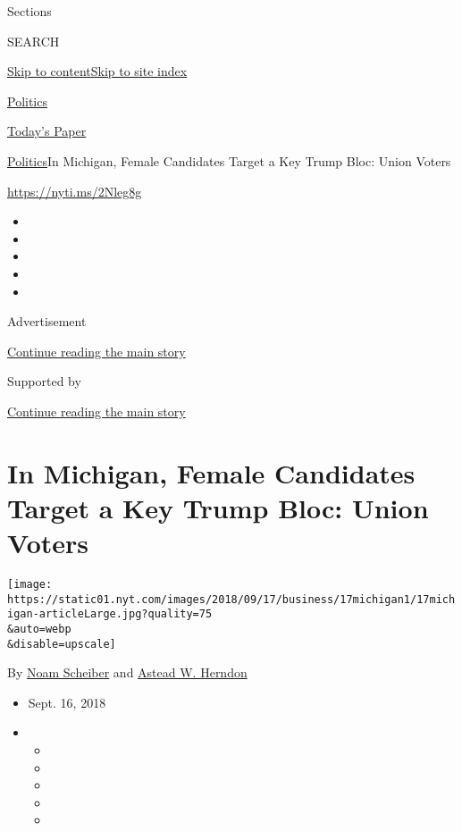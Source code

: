 Sections

SEARCH

\protect\hyperlink{site-content}{Skip to
content}\protect\hyperlink{site-index}{Skip to site index}

\href{https://www.nytimes.com/section/politics}{Politics}

\href{https://myaccount.nytimes.com/auth/login?response_type=cookie\&client_id=vi}{}

\href{https://www.nytimes.com/section/todayspaper}{Today's Paper}

\href{/section/politics}{Politics}\textbar{}In Michigan, Female
Candidates Target a Key Trump Bloc: Union Voters

\url{https://nyti.ms/2Nleg8g}

\begin{itemize}
\item
\item
\item
\item
\item
\end{itemize}

Advertisement

\protect\hyperlink{after-top}{Continue reading the main story}

Supported by

\protect\hyperlink{after-sponsor}{Continue reading the main story}

\hypertarget{in-michigan-female-candidates-target-a-key-trump-bloc-union-voters}{%
\section{In Michigan, Female Candidates Target a Key Trump Bloc: Union
Voters}\label{in-michigan-female-candidates-target-a-key-trump-bloc-union-voters}}

\texttt{[image: https://static01.nyt.com/images/2018/09/17/business/17michigan1/17michigan-articleLarge.jpg?quality=75\\\&auto=webp\\\&disable=upscale]}

By \href{https://www.nytimes.com/by/noam-scheiber}{Noam Scheiber} and
\href{https://www.nytimes.com/by/astead-w-herndon}{Astead W. Herndon}

\begin{itemize}
\item
  Sept. 16, 2018
\item
  \begin{itemize}
  \item
  \item
  \item
  \item
  \item
  \end{itemize}
\end{itemize}

